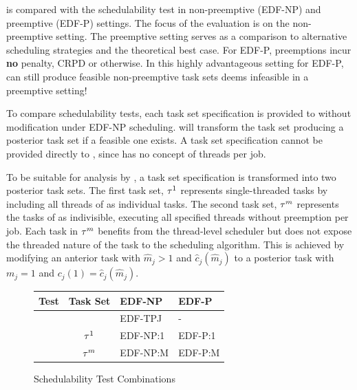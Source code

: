 \documentclass[a4paper,UKenglish,cleveref,autoref,english]{lipics-v2019}
\begin{document}
\tpj{} is compared with the \npchunks{} schedulability test in
non-preemptive (EDF-NP) and preemptive (EDF-P) settings. The focus of
the evaluation is on the non-preemptive setting. The preemptive
setting serves as a comparison to alternative scheduling strategies
and the theoretical best case. For EDF-P, preemptions incur
\textbf{no} penalty, CRPD or otherwise. In this highly advantageous
setting for EDF-P, \tpj{} can still produce feasible non-preemptive task
sets \npchunks{} deems infeasible in a preemptive setting!

To compare schedulability tests, each task set specification \ants{}
is provided to \tpj{} without modification under EDF-NP
scheduling. \tpj{} will transform the task set producing a
posterior task set \tasks{} if a feasible one exists. A task set
specification \ants{} cannot be provided directly to \npchunks{},
since \npchunks{} has no concept of threads per job. 

To be suitable for analysis by \npchunks{}, a task set specification
\ants{} is transformed into two posterior task sets. The first task
set, ${\tau{}^1}$ represents single-threaded tasks by including all
threads of \ants{} as individual tasks. The second task set,
${\tau{}^m}$ represents the tasks of \ants{} as indivisible,
executing all specified threads without preemption per job. Each task
in ${\tau{}^m}$ benefits from the  thread-level scheduler but does
not expose the threaded nature of the task to the scheduling
algorithm. This is achieved by modifying an anterior task  with
${\hat{m}_j > 1}$ and ${\hat{c}_j(\hat{m}_j)}$ to a posterior task
 with ${m_j = 1}$ and ${c_j(1) = \hat{c}_j(\hat{m}_j)}$. 

\begin{figure}[ht]
  \centering
  \begin{tabular}{|c|c|l|l|}
    \hline
    \textbf{Test} & \textbf{Task Set} & \textbf{EDF-NP} & \textbf{EDF-P} \\
    \hline
    \hline
    \tpj{} & \ants{} & EDF-TPJ & - \\
    \hline
    \multirow{2}{*}{\npchunks{}}
    & ${\tau{}^1}$ & EDF-NP:1 & EDF-P:1 \\
    & ${\tau{}^m}$ & EDF-NP:M & EDF-P:M \\
    \hline
  \end{tabular}
  \caption{Schedulability Test Combinations}
  \label{table:combinations}
\end{figure}
\end{document}

